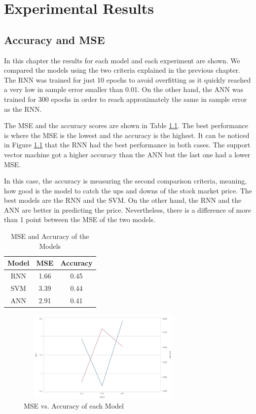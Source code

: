 \chapter{Experimental Results}
\label{ch:expResults}

\section{Accuracy and MSE}
In this chapter the results for each model and each experiment are shown. We compared the models using the two criteria explained in the previous chapter. The RNN was trained for just 10 epochs to avoid overfitting as it quickly reached a very low in sample error smaller than 0.01. On the other hand, the ANN was trained for 300 epochs in order to reach approximately the same in sample error as the RNN. 

The MSE and the accuracy scores are shown in Table \ref{table:accmse}. The best performance is where the MSE is the lowest and the accuracy is the highest. It can be noticed in Figure \ref{fig:accmse} that the RNN had the best performance in both cases. The support vector machine got a higher accuracy than the ANN but the last one had a lower MSE.

In this case, the accuracy is measuring the second comparison criteria, meaning, how good is the model to catch the ups and downs of the stock market price. The best models are the RNN and the SVM. On the other hand, the RNN and the ANN are better in predicting the price. Nevertheless, there is a difference of more than 1 point between the MSE of the two models.  

\begin{table}{}
\begin{center}
\begin{tabular}{ c | c | c }
    \hline
     \textbf{Model} &  \textbf{MSE} &    \textbf{Accuracy}\\ \hline
    RNN&  1.66&  0.45 \\ \hline
    SVM&  3.39&  0.44\\ \hline
    ANN&  2.91&  0.41\\ \hline
      \hline
  \end{tabular}
  \caption{MSE and Accuracy of the Models}
 \label{table:accmse}
\end{center}
 \end{table}

\begin{figure}
\label{fig:accmse}
\center
\includegraphics[width=8.5cm,height=4.5cm]{Figures/accmse.JPG}
\caption{MSE vs. Accuracy of each Model}
\end{figure}


